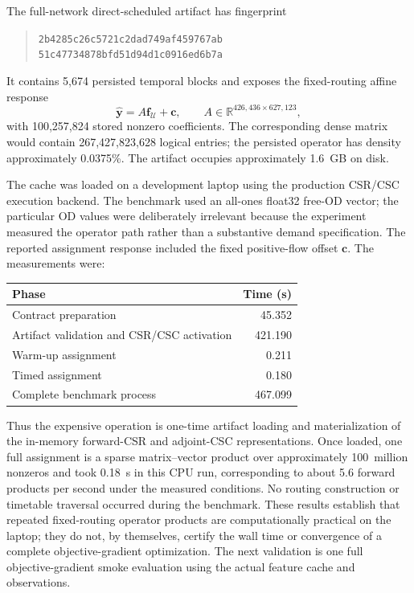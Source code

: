 The full-network direct-scheduled artifact has fingerprint
\begin{quote}
\texttt{2b4285c26c5721c2dad749af459767ab}\\
\texttt{51c47734878bfd51d94d1c0916ed6b7a}
\end{quote}
It contains 5,674 persisted temporal blocks and exposes the fixed-routing
affine response
\[
  \widehat{\bm y}=A\bm f_{\mathcal U}+\bm c,
  \qquad
  A\in\mathbb R^{426{,}436\times627{,}123},
\]
with 100,257,824 stored nonzero coefficients.  The corresponding dense
matrix would contain 267,427,823,628 logical entries; the persisted operator
has density approximately 0.0375\%.  The artifact occupies approximately
1.6~GB on disk.

The cache was loaded on a development laptop using the production CSR/CSC
execution backend.  The benchmark used an all-ones float32 free-OD vector;
the particular OD values were deliberately irrelevant because the experiment
measured the operator path rather than a substantive demand specification.
The reported assignment response included the fixed positive-flow offset
\(\bm c\).  The measurements were:

\begin{center}
\begin{tabular}{lr}
\hline
Phase & Time (s) \\
\hline
Contract preparation & 45.352 \\
Artifact validation and CSR/CSC activation & 421.190 \\
Warm-up assignment & 0.211 \\
Timed assignment & 0.180 \\
Complete benchmark process & 467.099 \\
\hline
\end{tabular}
\end{center}

Thus the expensive operation is one-time artifact loading and materialization
of the in-memory forward-CSR and adjoint-CSC representations.  Once loaded,
one full assignment is a sparse matrix--vector product over approximately
100~million nonzeros and took 0.18~s in this CPU run, corresponding to about
5.6 forward products per second under the measured conditions.  No routing
construction or timetable traversal occurred during the benchmark.  These
results establish that repeated fixed-routing operator products are
computationally practical on the laptop; they do not, by themselves, certify
the wall time or convergence of a complete objective-gradient optimization.
The next validation is one full objective-gradient smoke evaluation using the
actual feature cache and observations.
